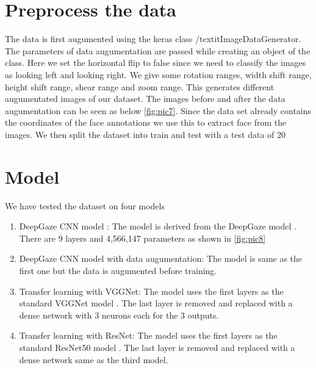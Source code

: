 \documentclass[a4paper, 12pt, oneside, BCOR1cm,toc=chapterentrywithdots]{scrbook}
\begin{document}
 



\section{Preprocess the data}

The data is first augumented using the keras class /textit{ImageDataGenerator}. The parameters of data augumentation are passed while creating an object of the class. Here we set the horizontal flip to false since we need to classify the images as looking left and looking right. We give some rotation ranges, width shift range, height shift range, shear range and zoom range. This generates different augumentated images of our dataset. The images before and after the data augumentation can be seen as below \ref{fig:pic7}. Since the data set already contains the coordinates of the face annotations we use this to extract face from the images. We then split the dataset into train and test with a test data of 20%





\section{Model}

We have tested the dataset on four models

\begin{enumerate}
	\item DeepGaze CNN model : The model is derived from the DeepGaze model \cite{}. There are 9 layers and 4,566,147 parameters as shown in \ref{fig:pic8} 
	\item DeepGaze CNN model with data augumentation: The model is same as the first one but the data is augumented before training. 
	\item Transfer learning with VGGNet: The model uses the first layers as the standard VGGNet model \cite{}. The last layer is removed and replaced with a dense network with 3 neurons each for the 3 outputs.
	\item Transfer learning with ResNet: The model uses the first layers as the standard ResNet50 model \cite{}. The last layer is removed and replaced with a dense network same as the third model.
\end{enumerate}
\end{document}
